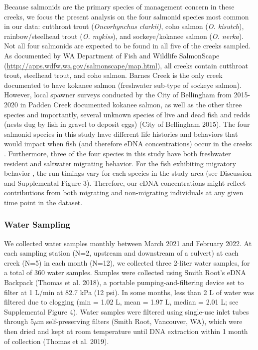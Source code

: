 \documentclass[
]{article}
\begin{document}
Because salmonids are the primary species of management concern in these
creeks, we focus the present analysis on the four salmonid species most
common in our data: cutthroat trout (\emph{Oncorhynchus clarkii)}, coho
salmon (\emph{O. kisutch}), rainbow/steelhead trout (\emph{O. mykiss}),
and sockeye/kokanee salmon (\emph{O. nerka}). Not all four salmonids are
expected to be found in all five of the creeks sampled. As documented by
WA Department of Fish and Wildlife SalmonScape
(\url{http://apps.wdfw.wa.gov/salmonscape/map.html}), all creeks contain
cutthroat trout, steelhead trout, and coho salmon. Barnes Creek is the
only creek documented to have kokanee salmon (freshwater sub-type of
sockeye salmon). However, local spawner surveys conducted by the City of
Bellingham from 2015-2020 in Padden Creek documented kokanee salmon, as
well as the other three species and importantly, several unknown species
of live and dead fish and redds (nests dug by fish in gravel to deposit
eggs) (City of Bellingham 2015). The four salmonid species in this study
have different life histories and behaviors that would impact when fish
(and therefore eDNA concentrations) occur in the creeks . Furthermore,
three of the four species in this study have both freshwater resident
and saltwater migrating behavior. For the fish exhibiting migratory
behavior , the run timings vary for each species in the study area (see
Discussion and Supplemental Figure 3). Therefore, our eDNA
concentrations might reflect contributions from both migrating and
non-migrating individuals at any given time point in the dataset.

\hypertarget{water-sampling}{%
\subsubsection{Water Sampling}\label{water-sampling}}

We collected water samples monthly between March 2021 and February 2022.
At each sampling station (N=2, upstream and downstream of a culvert) at
each creek (N=5) in each month (N=12), we collected three 2-liter water
samples, for a total of 360 water samples. Samples were collected using
Smith Root's eDNA Backpack (Thomas et al. 2018), a portable
pumping-and-filtering device set to filter at 1 L/min at 82.7 kPa (12
psi). In some months, less than 2 L of water was filtered due to
clogging (min = 1.02 L, mean = 1.97 L, median = 2.01 L; see Supplemental
Figure 4). Water samples were filtered using single-use inlet tubes
through 5\(\mu\)m self-preserving filters (Smith Root, Vancouver, WA),
which were then dried and kept at room temperature until DNA extraction
within 1 month of collection (Thomas et al. 2019).
\end{document}
